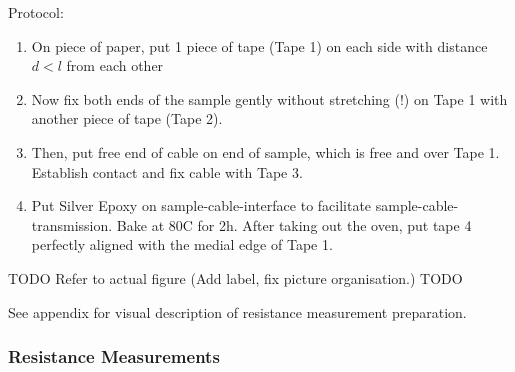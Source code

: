 Protocol:

\begin{enumerate}
    \item On piece of paper, put 1 piece of tape (Tape 1) on each side with distance $d < l$ from each other
    \item Now fix both ends of the sample gently without stretching (!) on Tape 1 with another piece of tape (Tape 2).
    \item Then, put free end of cable on end of sample, which is free and over Tape 1. Establish contact and fix cable with Tape 3.
    \item Put Silver Epoxy on sample-cable-interface to facilitate sample-cable-transmission. Bake at 80\textdegree C for 2h. After taking out the oven, put tape 4 perfectly aligned with the medial edge of Tape 1.
\end{enumerate}

    \begin{center}
    TODO
    Refer to actual figure (Add label, fix picture organisation.)
    TODO
    
See appendix for visual description of resistance measurement preparation.
    \end{center}


\subsubsection{Resistance Measurements}
